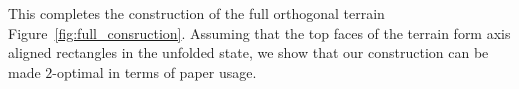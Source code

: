 This completes the construction of the full orthogonal terrain Figure~\ref{fig:full_consruction}.
Assuming that the top faces of the terrain form axis aligned rectangles in the unfolded state,
we show that our construction can be made $2$-optimal in terms of paper usage.
\begin{figure}[!ht]
    \centering
    \graphicspath{{../figures/column_connector}}
    \caption{}
    \label{fig:connector}
\end{figure}
